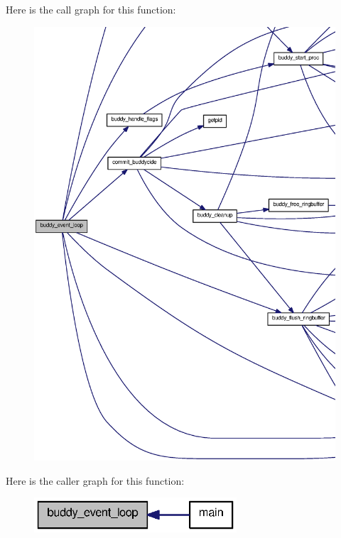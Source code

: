 Here is the call graph for this function:
\nopagebreak
\begin{figure}[H]
\begin{center}
\leavevmode
\includegraphics[width=400pt]{buddy_8h_ae6ccfa70197441b53a9e94023ee4671c_cgraph}
\end{center}
\end{figure}




Here is the caller graph for this function:\nopagebreak
\begin{figure}[H]
\begin{center}
\leavevmode
\includegraphics[width=214pt]{buddy_8h_ae6ccfa70197441b53a9e94023ee4671c_icgraph}
\end{center}
\end{figure}


